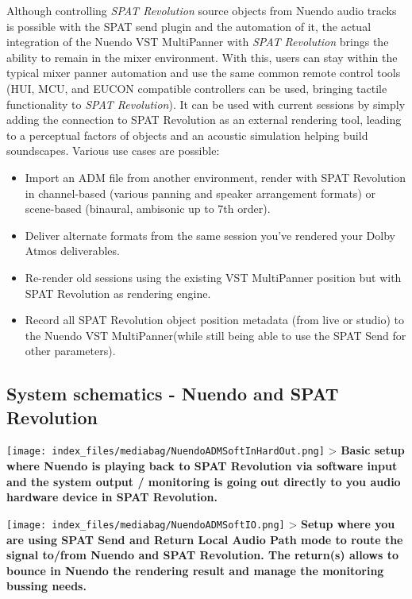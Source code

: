 \documentclass[
  letterpaper,
  DIV=11,
  numbers=noendperiod]{scrreport}
\providecommand{\tightlist}{%
  \setlength{\itemsep}{0pt}\setlength{\parskip}{0pt}}\usepackage{longtable,booktabs,array}
\begin{document}
Although controlling \emph{SPAT Revolution} source objects from Nuendo
audio tracks is possible with the SPAT send plugin and the automation of
it, the actual integration of the Nuendo VST MultiPanner with \emph{SPAT
Revolution} brings the ability to remain in the mixer environment. With
this, users can stay within the typical mixer panner automation and use
the same common remote control tools (HUI, MCU, and EUCON compatible
controllers can be used, bringing tactile functionality to \emph{SPAT
Revolution}). It can be used with current sessions by simply adding the
connection to SPAT Revolution as an external rendering tool, leading to
a perceptual factors of objects and an acoustic simulation helping build
soundscapes. Various use cases are possible:

\begin{itemize}
\tightlist
\item
  Import an ADM file from another environment, render with SPAT
  Revolution in channel-based (various panning and speaker arrangement
  formats) or scene-based (binaural, ambisonic up to 7th order).
\item
  Deliver alternate formats from the same session you've rendered your
  Dolby Atmos deliverables.
\item
  Re-render old sessions using the existing VST MultiPanner position but
  with SPAT Revolution as rendering engine.
\item
  Record all SPAT Revolution object position metadata (from live or
  studio) to the Nuendo VST MultiPanner(while still being able to use
  the SPAT Send for other parameters).
\end{itemize}

\hypertarget{system-schematics---nuendo-and-spat-revolution}{%
\subsection{System schematics - Nuendo and SPAT
Revolution}\label{system-schematics---nuendo-and-spat-revolution}}

\texttt{[image: index\_files/mediabag/NuendoADMSoftInHardOut.png]}
\textgreater{} \textbf{Basic setup where Nuendo is playing back to SPAT
Revolution via software input and the system output / monitoring is
going out directly to you audio hardware device in SPAT Revolution.}

\texttt{[image: index\_files/mediabag/NuendoADMSoftIO.png]}
\textgreater{} \textbf{Setup where you are using SPAT Send and Return
Local Audio Path mode to route the signal to/from Nuendo and SPAT
Revolution. The return(s) allows to bounce in Nuendo the rendering
result and manage the monitoring bussing needs.}
\end{document}

